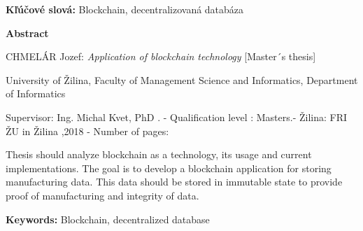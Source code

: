 \vspace{1em}

\noindent
{\bf Kľúčové slová:} Blockchain, decentralizovaná databáza

\pagebreak



\pagebreak

\begin{center}

\sc\Large\textbf{Abstract}
    
\end{center}

\noindent
{\sc CHMELÁR Jozef:} {\em Application of blockchain technology
}
[Master´s thesis] 

\noindent
University of Žilina,  
Faculty of Management Science and Informatics,  
Department of Informatics

\noindent  
Supervisor: Ing. Michal Kvet, PhD .  - Qualification level : Masters.- Žilina: FRI ŽU in Žilina ,2018 - Number of pages: \pageref{LastPage} 


\vspace{1em}

Thesis should analyze blockchain as a technology, its usage and current implementations. The goal is to develop a blockchain application for storing manufacturing data. This data should be stored in immutable state to provide proof of manufacturing and integrity of data.

\vspace{1em}

\noindent
{\bf Keywords:} Blockchain, decentralized database

\pagebreak

